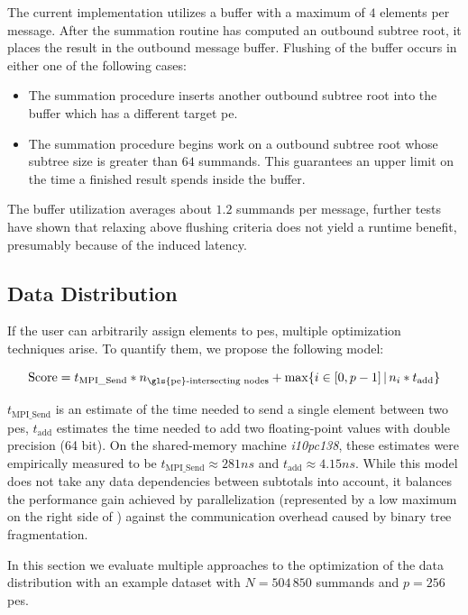 The current implementation utilizes a buffer with a maximum of $4$ elements per message.
After the summation routine has computed an outbound subtree root, it places the result in the outbound message buffer.
Flushing of the buffer occurs in either one of the following cases: \begin{itemize} 
\item The summation procedure inserts another outbound subtree root into the buffer which has a different target \gls{pe}.
\item The summation procedure begins work on a outbound subtree root whose subtree size is greater than $64$ summands. This guarantees an upper limit on the time a finished result spends inside the buffer.
\end{itemize}

The buffer utilization averages about $1.2$ summands per message, further tests have shown that relaxing above flushing criteria does not yield a runtime benefit, presumably because of the induced latency.

\subsection{Data Distribution}
\label{sec:DataDistribution}

If the user can arbitrarily assign elements to \glspl{pe}, multiple optimization techniques arise. To quantify them, we propose the following model:

\begin{equation}
\label{eq:distributionScore}
\textrm{Score} = t_{\textrm{MPI\_Send}} * n_{\textrm{\gls{pe}-intersecting nodes}} + \max \{ i \in [0, p - 1]\, |\, n_i * t_{\textrm{add}} \}
\end{equation}

$t_{\textrm{MPI\_Send}}$ is an estimate of the time needed to send a single element between two \glspl{pe}, $t_\textrm{add}$ estimates the time needed to add two floating-point values with double precision (64 bit).
On the shared-memory machine \textit{i10pc138}, these estimates were empirically measured to be $t_{\textrm{MPI\_Send}} \approx 281ns$ and $t_\textrm{add} \approx 4.15ns$.
While this model does not take any data dependencies between subtotals into account, it balances the performance gain achieved by parallelization (represented by a low maximum on the right side of ) against the communication overhead caused by binary tree fragmentation. 

In this section we evaluate multiple approaches to the optimization of the data distribution with an example dataset with $N = 504\,850$ summands and $p = 256$ \glspl{pe}.

